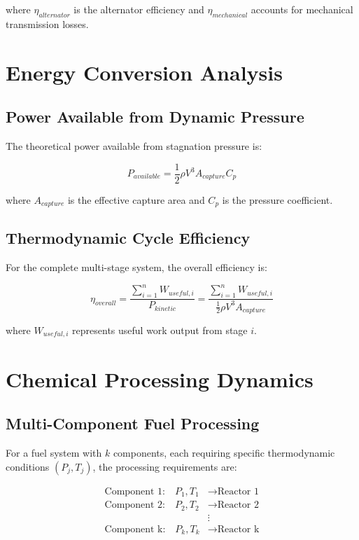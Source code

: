 \documentclass[12pt,a4paper]{article}
\begin{document}
where $\eta_{alternator}$ is the alternator efficiency and $\eta_{mechanical}$ accounts for mechanical transmission losses.

\section{Energy Conversion Analysis}

\subsection{Power Available from Dynamic Pressure}

The theoretical power available from stagnation pressure is:

\begin{equation}
P_{available} = \frac{1}{2}\rho V^3 A_{capture} C_p
\end{equation}

where $A_{capture}$ is the effective capture area and $C_p$ is the pressure coefficient.

\subsection{Thermodynamic Cycle Efficiency}

For the complete multi-stage system, the overall efficiency is:

\begin{equation}
\eta_{overall} = \frac{\sum_{i=1}^{n} W_{useful,i}}{P_{kinetic}} = \frac{\sum_{i=1}^{n} W_{useful,i}}{\frac{1}{2}\rho V^3 A_{capture}}
\end{equation}

where $W_{useful,i}$ represents useful work output from stage $i$.

\section{Chemical Processing Dynamics}

\subsection{Multi-Component Fuel Processing}

For a fuel system with $k$ components, each requiring specific thermodynamic conditions $(P_j, T_j)$, the processing requirements are:

\begin{align}
\text{Component 1:} \quad P_1, T_1 &\rightarrow \text{Reactor 1} \\
\text{Component 2:} \quad P_2, T_2 &\rightarrow \text{Reactor 2} \\
&\vdots \\
\text{Component k:} \quad P_k, T_k &\rightarrow \text{Reactor k}
\end{align}
\end{document}
